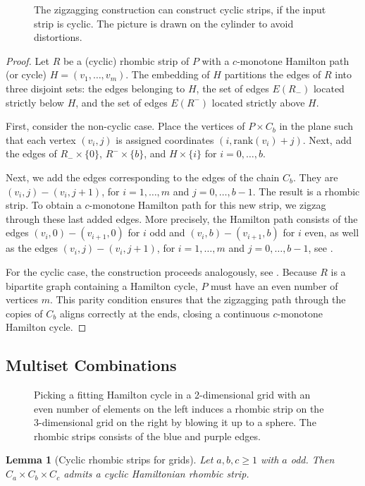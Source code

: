 \documentclass[fontsize=11pt,a4paper,DIV=12]{scrartcl}
\newtheorem{lemma}[theorem]{Lemma}
\begin{document}
\begin{figure}[!ht]
    \centering
    
    \caption{The zigzagging construction can construct cyclic strips, if the input strip is cyclic. The picture is drawn on the cylinder to avoid distortions.}
    \label{fig:cylinder}
\end{figure}

\zigzagging*
\begin{proof}
    Let $R$ be a (cyclic) rhombic strip of $P$ with a $c$-monotone Hamilton path (or cycle) $H=(v_1, \ldots, v_m)$. The embedding of $H$ partitions the edges of $R$ into three disjoint sets: the edges belonging to $H$, the set of edges $E(R_-)$ located strictly below $H$, and the set of edges $E(R^-)$ located strictly above $H$.

    First, consider the non-cyclic case. Place the vertices of $P\times C_b$ in the plane such that each vertex $(v_i,j)$ is assigned coordinates $(i, \text{rank}(v_i)+j)$. Next, add the edges of $R_-\times\{0\}$, $R^-\times\{b\}$, and $H\times\{i\}$ for $i=0,\ldots,b$.
    
    Next, we add the edges corresponding to the edges of the chain $C_b$. They are $(v_i,j)-(v_i,j+1)$, for $i=1,\ldots,m$ and $j=0,\ldots,b-1$. The result is a rhombic strip. To obtain a $c$-monotone Hamilton path for this new strip, we zigzag through these last added edges. More precisely, the Hamilton path consists of the edges $(v_i,0)-(v_{i+1},0)$ for $i$ odd and $(v_i,b)-(v_{i+1},b)$ for $i$ even, as well as the edges $(v_i,j)-(v_i,j+1)$, for $i=1,\ldots,m$ and $j=0,\ldots,b-1$, see .

    For the cyclic case, the construction proceeds analogously, see . Because $R$ is a bipartite graph containing a Hamilton cycle, $P$ must have an even number of vertices $m$. This parity condition ensures that the zigzagging path through the copies of $C_b$ aligns correctly at the ends, closing a continuous $c$-monotone Hamilton cycle.
\end{proof}

\subsection{Multiset Combinations}
\begin{figure}
    \centering
    
    \caption{Picking a fitting Hamilton cycle in a 2-dimensional grid with an even number of elements on the left induces a rhombic strip on the 3-dimensional grid on the right by blowing it up to a sphere. The rhombic strips consists of the blue and purple edges.}
    \label{fig:3dgrid}
\end{figure}
\begin{lemma}[Cyclic rhombic strips for grids]
\label{lem:cyclic-grid-seed}
Let $a,b,c \geq 1$ with $a$ odd. Then $C_a \times C_b \times C_c$ admits a
cyclic Hamiltonian rhombic strip.
\end{lemma}
\end{document}

